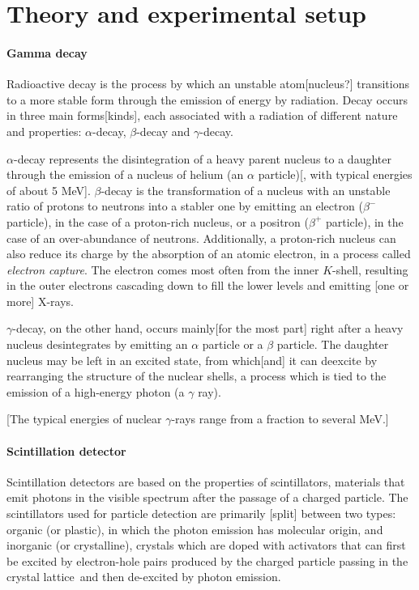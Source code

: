 \section{Theory and experimental setup}
\paragraph{Gamma decay}
Radioactive decay is the process by which an unstable atom[nucleus?] transitions to a more stable form through the emission of energy by radiation.
Decay occurs in three main forms[kinds], each associated with a radiation of different nature and properties: $\alpha$-decay, $\beta$-decay and $\gamma$-decay.

$\alpha$-decay represents the disintegration of a heavy parent nucleus to a daughter through the emission of a nucleus of helium (an $\alpha$ particle)[, with typical energies of about 5 MeV].
$\beta$-decay is the transformation of a nucleus with an unstable ratio of protons to neutrons into a stabler one by emitting an electron ($\beta^-$ particle), in the case of a proton-rich nucleus, or a positron ($\beta^+$ particle), in the case of an over-abundance of neutrons.
Additionally, a proton-rich nucleus can also reduce its charge by the absorption of an atomic electron, in a process called \emph{electron capture}.
The electron comes most often from the inner $K$-shell, resulting in the outer electrons cascading down to fill the lower levels and emitting [one or more] X-rays\cite{intro_nuclear_particle_physics}.

$\gamma$-decay, on the other hand, occurs mainly[for the most part] right after a heavy nucleus desintegrates by emitting an $\alpha$ particle or a $\beta$ particle.
The daughter nucleus may be left in an excited state, from which[and] it can deexcite by rearranging the structure of the nuclear shells, 
a process which is tied to the emission of a high-energy photon (a $\gamma$ ray).

[The typical energies of nuclear $\gamma$-rays range from a fraction to several MeV.]

\paragraph{Scintillation detector}
Scintillation detectors are based on the properties of scintillators, materials that emit photons in the visible spectrum after the passage of a charged particle.
The scintillators used for particle detection are primarily [split] between two types: organic (or plastic), in which the photon emission has molecular origin, 
and inorganic (or crystalline), crystals which are doped with activators that can first be excited by electron-hole pairs 
produced by the charged particle passing in the crystal lattice\footnotemark\ and then de-excited by photon emission\cite{intro_nuclear_particle_physics}.

